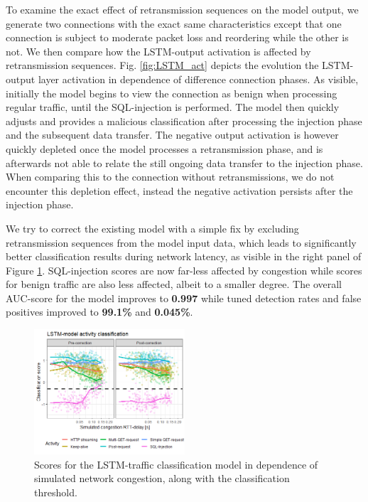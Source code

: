 \documentclass[conference]{IEEEtran}
\begin{document}
To examine the exact effect of retransmission sequences on the model output, we generate two connections with the exact same characteristics except that one connection is subject to moderate packet loss and reordering while the other is not. We then compare how the LSTM-output activation is affected by retransmission sequences. Fig. \ref{fig:LSTM_act} depicts the evolution the LSTM-output layer activation in dependence of difference connection phases. As visible, initially the model begins to view the connection as benign when processing regular traffic, until the SQL-injection is performed. The model then quickly adjusts and provides a malicious classification after processing the injection phase and the subsequent data transfer. The negative output activation is however quickly depleted once the model processes a retransmission phase, and is afterwards not able to relate the still ongoing data transfer to the injection phase. When comparing this to the connection without retransmissions, we do not encounter this depletion effect, instead the negative activation persists after the injection phase.

We try to correct the existing model with a simple fix by excluding retransmission sequences from the model input data, which leads to significantly better classification results during network latency, as visible in the right panel of Figure \ref{fig:LSTM_exp}. SQL-injection scores are now far-less affected by congestion while scores for benign traffic are also less affected, albeit to a smaller degree.
The overall AUC-score for the model improves to \textbf{0.997} while tuned detection rates and false positives improved to \textbf{99.1\%} and \textbf{0.045\%}.


\begin{figure}
\centering
\includegraphics[width=0.5\textwidth]{images/LSTM_classi.png}
\caption{Scores for the LSTM-traffic classification model in dependence of simulated network congestion, along with the classification threshold. }\label{fig:LSTM_exp}
\end{figure}
\end{document}
